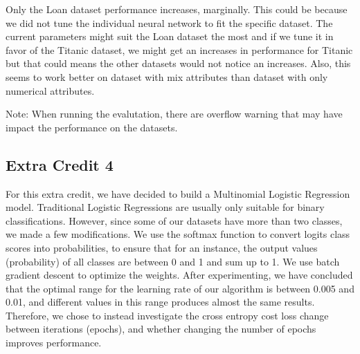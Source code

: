 \documentclass[letterpaper]{article}
\begin{document}
Only the Loan dataset performance increases, marginally. This could be because we did not tune the individual neural network to fit the specific dataset.
The current parameters might suit the Loan dataset the most and if we tune it in favor of the Titanic dataset, we might get an increases in performance
for Titanic but that could means the other datasets would not notice an increases. Also, this seems to work better on dataset with mix attributes than
dataset with only numerical attributes.

Note: When running the evalutation, there are overflow warning that may have impact the performance on the datasets.

\subsection*{Extra Credit 4}

For this extra credit, we have decided to build a Multinomial Logistic Regression model. Traditional Logistic Regressions are usually only suitable for binary classifications.
However, since some of our datasets have more than two classes, we made a few modifications.
We use the softmax function to convert logits class scores into probabilities, to ensure that for an instance, the output values (probability) of all classes are between 0 and 1 and sum up to 1.
We use batch gradient descent to optimize the weights. After experimenting, we have concluded that the optimal range for the learning rate of our algorithm is between 0.005 and 0.01, and different values in this range produces almost the same results.
Therefore, we chose to instead investigate the cross entropy cost loss change between iterations (epochs), and whether changing the number of epochs improves performance.
\end{document}
